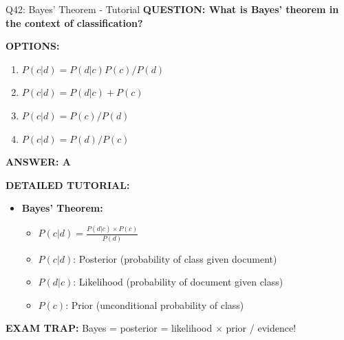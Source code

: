 \documentclass[8pt]{beamer}
\begin{document}
	\begin{frame}{Q42: Bayes' Theorem - Tutorial}
		\fontsize{6.5}{7.5}\selectfont
		\textbf{QUESTION: What is Bayes' theorem in the context of classification?}
		
		\vspace{0.1cm}
		\textbf{OPTIONS:}
		\begin{enumerate}
			\item $P(c|d) = P(d|c)P(c) / P(d)$
			\item $P(c|d) = P(d|c) + P(c)$
			\item $P(c|d) = P(c) / P(d)$
			\item $P(c|d) = P(d) / P(c)$
		\end{enumerate}
		
		\vspace{0.1cm}
		\textcolor{myblue}{\textbf{ANSWER: A}}
		
		\vspace{0.1cm}
		\textbf{DETAILED TUTORIAL:}
		\begin{itemize}
			\item \textbf{Bayes' Theorem:}
			\begin{itemize}
				\item $P(c|d) = \frac{P(d|c) \times P(c)}{P(d)}$
				\item $P(c|d)$: Posterior (probability of class given document)
				\item $P(d|c)$: Likelihood (probability of document given class)
				\item $P(c)$: Prior (unconditional probability of class)
			\end{itemize}
		\end{itemize}
		
		\textcolor{myred}{\textbf{EXAM TRAP:}} Bayes = \textcolor{myblue}{posterior = likelihood $\times$ prior / evidence}!
	\end{frame}
	
\end{document}
